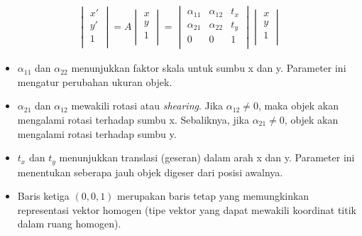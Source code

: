         \begin{equation}
         \begin{aligned}
            \begin{vmatrix}
                x' \\
                y' \\
                1 \\
            \end{vmatrix} = A \begin{vmatrix}
                x \\
                y \\
                1 \\
            \end{vmatrix} = \begin{vmatrix}
                \alpha_{11} & \alpha_{12} & t_x \\
                \alpha_{21} & \alpha_{22} & t_y \\
                0 & 0 & 1 \\
            \end{vmatrix} \begin{vmatrix}
                x \\
                y \\
                1 \\
            \end{vmatrix}
            \end{aligned} \label{Affine Transformation}
        \end{equation}


        \begin{itemize}
            \item $\alpha_{11}$ dan $\alpha_{22}$ menunjukkan faktor skala untuk sumbu x dan y. Parameter ini mengatur perubahan ukuran objek.

            \item  $\alpha_{21}$ dan $\alpha_{12}$ mewakili rotasi atau \textit{shearing}. Jika  $\alpha_{12} \neq 0$, maka objek akan mengalami rotasi terhadap sumbu x. Sebaliknya, jika $\alpha_{21} \neq 0$, objek akan mengalami rotasi terhadap sumbu y.

            \item $t_x$ dan $t_y$ menunjukkan translasi (geseran) dalam arah x dan y. Parameter ini menentukan seberapa jauh objek digeser dari posisi awalnya.

            \item Baris ketiga $(0,0,1)$ merupakan baris tetap yang memungkinkan representasi vektor homogen (tipe vektor yang dapat mewakili koordinat titik dalam ruang homogen).

            
        \end{itemize}

